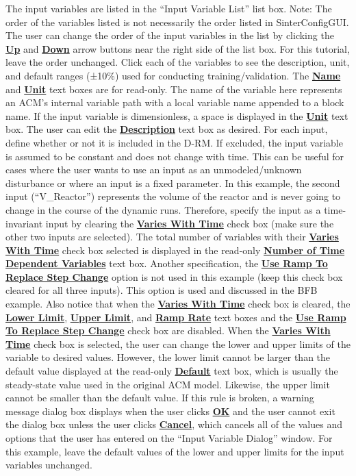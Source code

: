 \begin{enumerate}
	The input variables are listed in the ``Input Variable List'' list box.  Note: The order of the variables listed is not necessarily the order listed in SinterConfigGUI. The user can change the order of the input variables in the list by clicking the \textbf{\underline{Up}} and \textbf{\underline{Down}} arrow buttons near the right side of the list box.  For this tutorial, leave the order unchanged.  Click each of the variables to see the description, unit, and default ranges (±10\%) used for conducting training/validation.  The \textbf{\underline{Name}} and \textbf{\underline{Unit}} text boxes are for read-only.  The name of the variable here represents an ACM's internal variable path with a local variable name appended to a block name.  If the input variable is dimensionless, a space is displayed in the \textbf{\underline{Unit}} text box.  The user can edit the \textbf{\underline{Description}} text box as desired.  For each input, define whether or not it is included in the D-RM.  If excluded, the input variable is assumed to be constant and does not change with time.  This can be useful for cases where the user wants to use an input as an unmodeled/unknown disturbance or where an input is a fixed parameter.  In this example, the second input (``V\_Reactor'') represents the volume of the reactor and is never going to change in the course of the dynamic runs.  Therefore, specify the input as a time-invariant input by clearing the \textbf{\underline{Varies With Time}} check box (make sure the other two inputs are selected).  The total number of variables with their \textbf{\underline{Varies With Time}} check box selected is displayed in the read-only \textbf{\underline{Number of Time Dependent Variables}} text box.  Another specification, the \textbf{\underline{Use Ramp To Replace Step Change}} option is not used in this example (keep this check box cleared for all three inputs).  This option is used and discussed in the BFB example.  Also notice that when the \textbf{\underline{Varies With Time}} check box is cleared, the \textbf{\underline{Lower Limit}}, \textbf\underline{{Upper Limit}}, and \textbf{\underline{Ramp Rate}} text boxes and the \textbf{\underline{Use Ramp To Replace Step Change}} check box are disabled.  When the \textbf{\underline{Varies With Time}} check box is selected, the user can change the lower and upper limits of the variable to desired values.  However, the lower limit cannot be larger than the default value displayed at the read-only \textbf{\underline{Default}} text box, which is usually the steady-state value used in the original ACM model.  Likewise, the upper limit cannot be smaller than the default value.  If this rule is broken, a warning message dialog box displays when the user clicks \textbf{\underline{OK}} and the user cannot exit the dialog box unless the user clicks \textbf{\underline{Cancel}}, which cancels all of the values and options that the user has entered on the ``Input Variable Dialog'' window.  For this example, leave the default values of the lower and upper limits for the input variables unchanged.



\end{enumerate}

